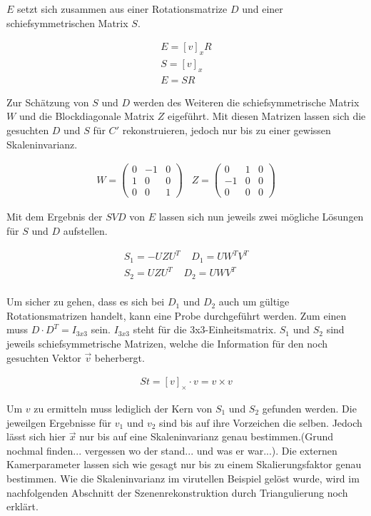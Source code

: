 $E$ setzt sich zusammen aus einer Rotationsmatrize $D$ und einer schiefsymmetrischen Matrix $S$\cite{HZ}. 

\begin{gather}
E=[v]_xR\\
S =[v]_x\\
E=SR
\end{gather}

Zur Schätzung von $S$ und $D$ werden des Weiteren die schiefsymmetrische Matrix \ensuremath{W} und die Blockdiagonale Matrix \ensuremath{Z} eigeführt\cite{HZ}. Mit diesen Matrizen lassen sich die gesuchten $D$ und $S$ für $C'$ rekonstruieren, jedoch nur bis zu einer gewissen Skaleninvarianz\cite{HZ,Ferid}.


\begin{gather}
W = \begin{pmatrix}
0&-1&0\\
1&0&0\\
0&0&1
\end{pmatrix} \;\;\;
Z=
\begin{pmatrix}
0&1&0\\
-1&0&0\\
0&0&0
\end{pmatrix}
\end{gather}

Mit dem Ergebnis der $SVD$ von \ensuremath{E} lassen sich nun jeweils zwei mögliche Lösungen für $S$ und $D$ aufstellen.


\begin{gather}
S_1 = -UZU^T \;\;\;\; D_1 = UW^TV^T\\
S_2 = UZU^T \;\;\;\; D_2 = UWV^T
\end{gather}\\


Um sicher zu gehen, dass es sich bei \ensuremath{D_1} und \ensuremath{D_2} auch um gültige Rotationsmatrizen handelt, kann eine Probe durchgeführt werden. Zum einen muss \ensuremath{D\cdot D^T=I_{3x3}} sein. \ensuremath{I_{3x3}} steht für die 3x3-Einheitsmatrix.  $S_1$ und $S_2$ sind jeweils schiefsymmetrische Matrizen, welche die Information für den noch gesuchten Vektor $\vec{v}$ beherbergt\cite{HZ}. 

\begin{gather}
St = [v]_\times \cdot v = v \times v
\end{gather} 

Um $v$ zu ermitteln muss lediglich der Kern von $S_1$ und $S_2$ gefunden werden. Die jeweilgen Ergebnisse für $v_1$ und $v_2$ sind bis auf ihre Vorzeichen die selben. Jedoch lässt sich hier $\vec{x}$ nur bis auf eine Skaleninvarianz genau bestimmen.(Grund nochmal finden... vergessen wo der stand... und was er war...). Die externen Kamerparameter lassen sich wie gesagt nur bis zu einem Skalierungsfaktor genau bestimmen\cite{HZ,Ferid}. Wie die Skaleninvarianz im virutellen Beispiel gelöst wurde, wird im nachfolgenden Abschnitt der Szenenrekonstruktion durch Triangulierung noch erklärt. \\


